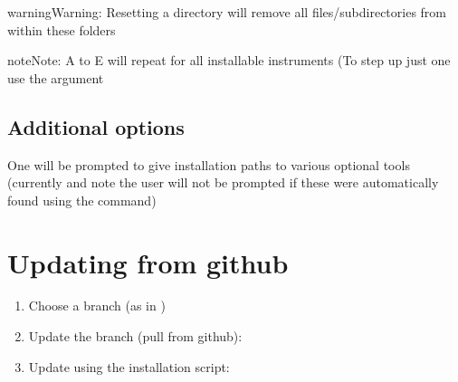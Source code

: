 \documentclass[a4paper,10pt,english]{report}
\begin{document}
\begin{sphinxadmonition}{warning}{Warning:}
Resetting a directory will remove all files/sub\sphinxhyphen{}directories from within these folders
\end{sphinxadmonition}

\begin{sphinxadmonition}{note}{Note:}
A to E will repeat for all installable instruments (To step up just one use the  argument
\end{sphinxadmonition}


\subsection{Additional options}
\label{\detokenize{user/installation:additional-options}}
One will be prompted to give installation paths to various optional tools (currently {\hyperref[\detokenize{misc/glossary:term-ds9}]{}}
and {\hyperref[\detokenize{misc/glossary:term-pdflatex}]{}}
note the user will not be prompted if these were automatically found using the 
command)


\section{Updating from github}
\label{\detokenize{user/installation:updating-from-github}}\label{\detokenize{user/installation:installation-update}}\begin{enumerate}
%
\item {} 
Choose a branch (as in {\hyperref[\detokenize{user/installation:installation-choose-branch}]{}})

\item {} 
Update the branch (pull from github):

\begin{sphinxVerbatim}[commandchars=\\\{\}]
    
\end{sphinxVerbatim}

\item {} 
Update using the installation script:

\begin{sphinxVerbatim}[commandchars=\\\{\}]
   
\end{sphinxVerbatim}

\end{enumerate}
\end{document}
